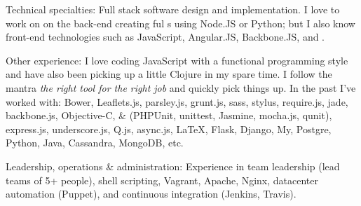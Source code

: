 \documentclass[10pt,a4paper]{article}
\begin{document}
\inlineheadsection  %
  {Technical specialties:}
  {Full stack software design and implementation. I love to work on on the back-end creating ful s using Node.JS or Python; but I also know front-end technologies such as JavaScript, Angular.JS, Backbone.JS,  and .}

\inlineheadsection  %
  {Other experience:}
  {I love coding JavaScript with a functional programming style and have also been picking up a little Clojure in my spare time. I follow the mantra \emph{the right tool for the right job} and quickly pick things up. In the past I've worked with: Bower, Leaflets.js, parsley.js, grunt.js, sass, stylus, require.js, jade, backbone.js, Objective-C,  \&  (PHPUnit, unittest, Jasmine, mocha.js, qunit), express.js, underscore.js, Q.js, async.js, \LaTeX, Flask, Django, My, Postgre, Python, Java, Cassandra, MongoDB, etc.}

\inlineheadsection  %
  {Leadership, operations \& administration:}
  {Experience in team leadership (lead teams of 5+ people), shell scripting, Vagrant, Apache, Nginx, datacenter automation (Puppet), and continuous integration (Jenkins, Travis).}

\spacedhrule{1.5em}{-0.4em}

\end{document}
